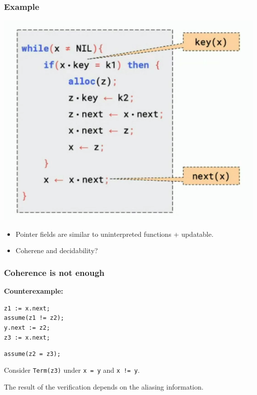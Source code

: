 \documentclass[aspectratio=1610, 13pt]{beamer}
\begin{document}
\begin{frame}\frametitle{Example}

\begin{multicols}{2}
\begin{center}

\includegraphics[scale=0.35]{hmp.png}
\end{center}
\vspace{2cm}
\begin{itemize}
\item Pointer fields are similar to uninterpreted functions + updatable.

\item Coherene and decidability?
\end{itemize}






\end{multicols}

\end{frame}

\begin{frame}\frametitle{Coherence is not enough}
\textbf{Counterexample: }
\begin{example}
\texttt{z1 := x.next;\\assume(z1 != z2);\\ y.next := z2;\\ z3 := x.next;}

\texttt{assume(z2 = z3);}
\end{example}

Consider \texttt{Term(z3)} under \texttt{x = y} and \texttt{x != y}.


The result of the verification depends on the aliasing information.

\end{frame}
\end{document}
